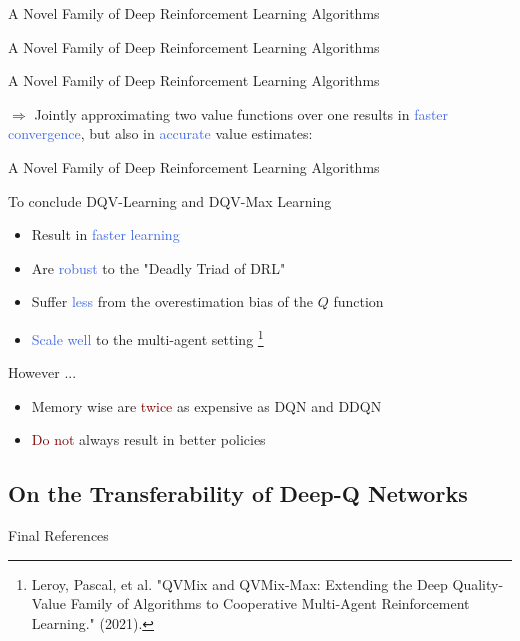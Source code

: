 \documentclass{beamer}
\begin{document}
\begin{frame}{A Novel Family of Deep Reinforcement Learning Algorithms}
	
\end{frame}

\begin{frame}{A Novel Family of Deep Reinforcement Learning Algorithms}
	
\end{frame}

\begin{frame}{A Novel Family of Deep Reinforcement Learning Algorithms}

	$\Rightarrow$ Jointly approximating two value functions over one results in \textcolor{RoyalBlue}{faster convergence}, but also in \textcolor{RoyalBlue}{accurate} value estimates:

	

\end{frame}

\begin{frame}{A Novel Family of Deep Reinforcement Learning Algorithms}

	To conclude DQV-Learning and DQV-Max Learning

	\begin{itemize}
		\item Result in \textcolor{RoyalBlue}{faster learning}
		\item Are \textcolor{RoyalBlue}{robust} to the "Deadly Triad of DRL"
		\item Suffer \textcolor{RoyalBlue}{less} from the overestimation bias of the $Q$ function 
		\item \textcolor{RoyalBlue}{Scale well} to the multi-agent setting \footnote{Leroy, Pascal, et al. "QVMix and QVMix-Max: Extending the Deep Quality-Value Family of Algorithms to Cooperative Multi-Agent Reinforcement Learning." (2021).}
	\end{itemize}

	However ... 

	\begin{itemize}
		\item Memory wise are \textcolor{Maroon}{twice} as expensive as DQN and DDQN
		\item \textcolor{Maroon}{Do not} always result in better policies
	\end{itemize}

\end{frame}




\begin{frame}
	\subsection{On the Transferability of Deep-Q Networks}
\end{frame}

\begin{frame}{Final References}

\end{frame}

\end{document}
